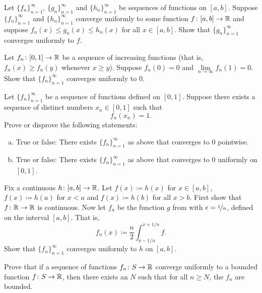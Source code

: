 \begin{exercise}
Let $\{ f_n \}_{n=1}^\infty$, $\{ g_n \}_{n=1}^\infty$ and
$\{ h_n \}_{n=1}^\infty$ be sequences of functions on
$[a,b]$.  Suppose $\{ f_n \}_{n=1}^\infty$ and $\{ h_n \}_{n=1}^\infty$ converge uniformly to some function
$f \colon [a,b] \to {\mathbb{R}}$ and suppose $f_n(x) \leq g_n(x) \leq h_n(x)$
for all $x \in [a,b]$.  Show that $\{ g_n \}_{n=1}^\infty$ converges uniformly to $f$.
\end{exercise}

\begin{exercise}
Let $f_n \colon [0,1] \to {\mathbb{R}}$ be a sequence of increasing functions (that
is, $f_n(x) \geq f_n(y)$ whenever $x \geq y$).  Suppose $f_n(0) = 0$
and $\lim\limits_{n \to \infty} f_n(1) = 0$.  Show that
$\{ f_n \}_{n=1}^\infty$
converges uniformly to $0$.
\end{exercise}

\begin{exercise}
Let $\{f_n\}_{n=1}^\infty$ be a sequence of functions defined on $[0,1]$.
Suppose there exists a sequence of distinct numbers $x_n \in [0,1]$ such that
\begin{equation*}
f_n(x_n) = 1 .
\end{equation*}
Prove or disprove the following statements:
\begin{enumerate}[a)]
\item
True or false: There exists $\{ f_n \}_{n=1}^\infty$ as above that converges to $0$
pointwise.
\item
True or false: There exists $\{ f_n \}_{n=1}^\infty$ as above that converges to $0$
uniformly on $[0,1]$.
\end{enumerate}
\end{exercise}

\begin{exercise}
Fix a continuous $h \colon [a,b] \to {\mathbb{R}}$.
Let $f(x) \coloneqq h(x)$ for $x \in [a,b]$,
$f(x) \coloneqq h(a)$ for $x < a$ and $f(x) \coloneqq h(b)$ for all $x > b$.  First show
that $f \colon {\mathbb{R}} \to {\mathbb{R}}$ is continuous.
Now let $f_n$ be
the function $g$ from  with
$\epsilon = \nicefrac{1}{n}$, defined on the interval $[a,b]$.  That is,
\begin{equation*}
f_n(x) \coloneqq \frac{n}{2} \int_{x-1/n}^{x+1/n} f .
\end{equation*}
Show that $\{ f_n \}_{n=1}^\infty$ converges uniformly to $h$ on $[a,b]$.
\end{exercise}


\begin{exercise}
Prove that
if a sequence of functions $f_n \colon S \to {\mathbb{R}}$
converge uniformly to a bounded function $f \colon S \to {\mathbb{R}}$,
then there exists an $N$ such that for all $n \geq N$, the $f_n$
are bounded.
\end{exercise}

